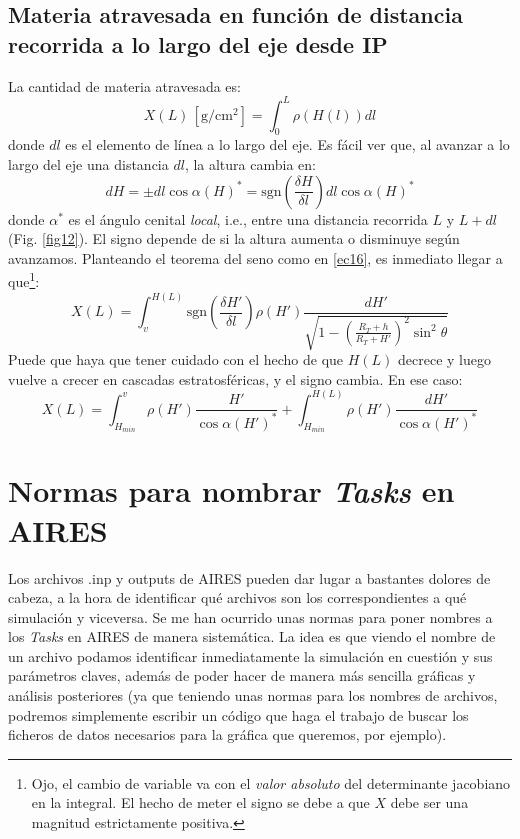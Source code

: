 \documentclass[a4paper,12pt]{article}
\numberwithin{equation}{section}
\numberwithin{figure}{section}
\begin{document}
\subsection{Materia atravesada en función de distancia recorrida a lo largo del eje desde IP}
La cantidad de materia atravesada es:
\begin{equation}
	X(L)\,\left[\mathrm{g/cm^2}\right]=\int_{0}^L\rho(H(l))dl\label{ec18}
\end{equation}
donde $dl$ es el elemento de línea a lo largo del eje. Es fácil ver que, al avanzar a lo largo del eje una distancia $dl$, la altura cambia en:
\begin{equation}
	dH = \pm dl \cos{\alpha(H)^*} = \mathrm{sgn}\left(\frac{\delta H}{\delta l}\right) dl \cos{\alpha(H)^*}\label{ec19}
\end{equation}
donde $\alpha^*$ es el ángulo cenital \textit{local}, i.e., entre una distancia recorrida $L$ y $L+dl$ (Fig. \ref{fig12}). El signo depende de si la altura aumenta o disminuye según avanzamos. Planteando el teorema del seno como en \eqref{ec16}, es inmediato llegar a que\footnote{ Ojo, el cambio de variable va con el \textit{valor absoluto} del determinante jacobiano en la integral. El hecho de meter el signo se debe a que $X$ debe ser una magnitud estrictamente positiva.}:
\begin{equation}
	X(L) = \int_{v}^{H(L)}\mathrm{sgn}\left(\frac{\delta H'}{\delta l}\right)\rho(H')\frac{dH'}{\sqrt{1-\left(\frac{R_T+h}{R_T+H'}\right)^2\sin^2\theta}}\label{ec110}
\end{equation}
Puede que haya que tener cuidado con el hecho de que $H(L)$ decrece y luego vuelve a crecer en cascadas estratosféricas, y el signo cambia. En ese caso:
\begin{equation}
	X(L) = \int_{H_{min}}^{v}\rho(H')\frac{H'}{\cos\alpha(H')^*}+\int_{H_{min}}^{H(L)}\rho(H')\frac{dH'}{\cos\alpha(H')^*}\label{ec111}
\end{equation}

\section{Normas para nombrar \textit{Tasks} en AIRES}
Los archivos .inp y outputs de AIRES pueden dar lugar a bastantes dolores de cabeza, a la hora de identificar qué archivos son los correspondientes a qué simulación y viceversa. Se me han ocurrido unas normas para poner nombres a los \textit{Tasks} en AIRES de manera sistemática. La idea es que viendo el nombre de un archivo podamos identificar inmediatamente la simulación en cuestión y sus parámetros claves, además de poder hacer de manera más sencilla gráficas y análisis posteriores (ya que teniendo unas normas para los nombres de archivos, podremos simplemente escribir un código que haga el trabajo de buscar los ficheros de datos necesarios para la gráfica que queremos, por ejemplo).
\end{document}
